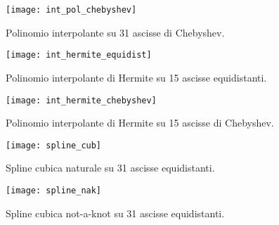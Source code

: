 \begin{figure}
  \centering
  \texttt{[image: int\_pol\_chebyshev]}
  \caption{Polinomio interpolante su 31 ascisse di Chebyshev.}
\end{figure}

\begin{figure}
  \centering
  \texttt{[image: int\_hermite\_equidist]}
  \caption{Polinomio interpolante di Hermite su 15 ascisse equidistanti.}
\end{figure}

\begin{figure}
  \centering
  \texttt{[image: int\_hermite\_chebyshev]}
  \caption{Polinomio interpolante di Hermite su 15 ascisse di Chebyshev.}
\end{figure}

\begin{figure}
  \centering
  \texttt{[image: spline\_cub]}
  \caption{Spline cubica naturale su 31 ascisse equidistanti.}
\end{figure}

\begin{figure}
  \centering
  \texttt{[image: spline\_nak]}
  \caption{Spline cubica not-a-knot su 31 ascisse equidistanti.}
\end{figure}